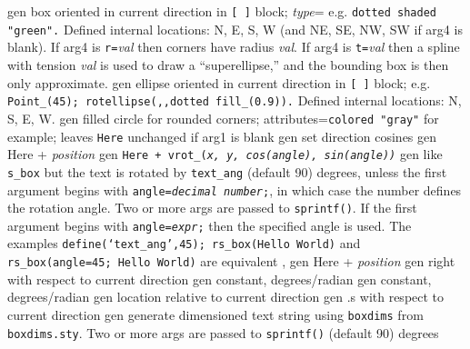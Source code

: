   {gen}
  {box oriented in current direction in {\tt [ ]} block;
   {\sl type}= e.g. {\tt dotted shaded "green".}  Defined internal
   locations: N, E, S, W (and NE, SE, NW, SW if arg4 is blank).  If arg4
   is {\tt r=}{\sl val} then corners have radius {\sl val}.  If arg4 is
   {\tt t=}{\sl val} then a spline with tension {\sl val} is used to draw
   a ``superellipse,'' and the bounding box is then only approximate. }
  {gen}
  {ellipse oriented in current direction in {\tt [ ]} block;
   e.g. {\tt Point\_(45); rotellipse(,{},dotted fill\_(0.9)).} Defined
   internal locations: N, S, E, W.}
  {gen}
  {filled circle for rounded corners; attributes={\tt colored
  "gray"}
   for example; leaves {\tt Here} unchanged if arg1 is blank
    }
  {gen}
  {set direction cosines}
  {gen}
  {Here + {\sl position}}
  {gen}
  {\tt Here + vrot\_({\sl x, y, cos(angle), sin(angle))}}
  {gen}
  {like {\tt s\_box} but the text is rotated by {\tt text\_ang}
   (default 90) degrees, unless
   the first argument begins with {\tt angle={\sl decimal number};},
   in which case the number defines the rotation angle.
   Two or more args are passed to {\tt sprintf()}.
   If the first argument begins with {\tt angle={\sl expr};} then
   the specified angle is used.
   The examples {\tt define(`text\_ang',45); rs\_box(Hello World)} and
   {\tt rs\_box(angle=45; Hello World)} are equivalent
   , }
  {gen}
  {Here + {\sl position}}
  {gen}
  {right with respect to current direction}
  {gen}
  {constant, degrees/radian}
  {gen}
  {constant, degrees/radian}
  {gen}
  {location relative to current direction}
%
  {gen}
  {.s with respect to current direction}
  {gen}
  {generate dimensioned text string using {\tt{}boxdims} from
    {\tt boxdims.sty}. Two or more args are passed to {\tt sprintf()}
   (default 90) degrees }
